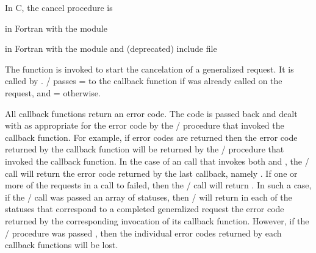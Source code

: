 In C, the cancel procedure is


\par\noindent
in Fortran with the  module


\par\noindent
in Fortran with the  module and (deprecated)  include file


The  function is invoked to start the cancelation of
a generalized request.
It is called by .
\MPI/ passes  =  to the callback function if 
 was already called on the request,
and  =  otherwise.

All callback functions return an error code.  
The code is passed back and dealt with as appropriate for the error
code by the \MPI/ procedure that invoked the callback function.  For
example, if error codes are returned then the error code returned by
the callback function will be returned by the \MPI/ procedure that
invoked the callback function.
In the case of
an 
%
%
 call that invokes both
 and , the \MPI/ call will return
the error code returned by the last callback, namely
.  If one or more of the requests in a call to
%
%
%
%
 failed,
then the \MPI/ call will return
. 
In such a case, if the \MPI/ call was
passed an array of statuses, then \MPI/ will return in each of the
statuses that correspond to a completed generalized request the error
code returned by the corresponding invocation of its 
callback function.  However, if the \MPI/ procedure was passed
, then the individual error codes
returned by each callback functions will be lost.

